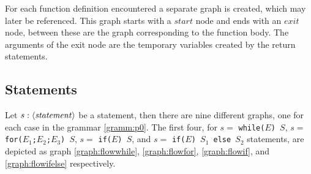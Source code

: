 For each function definition encountered a separate graph is created, which may later be referenced. This graph starts with a $\mathit{start}$ node and ends with an $\mathit{exit}$ node, between these are the graph corresponding to the function body. The arguments of the exit node are the temporary variables created by the return statements. 

\subsection{Statements}
Let $s : \langle\mathit{statement}\rangle$ be a statement, then there are nine different graphs, one for each case in the grammar \ref{gramm:p0}. The first four, for $s = $ \texttt{while($E$) $S$}, $s = $ \texttt{for($E_1$;$ E_2$;$E_3$) $S$}, $s = $ \texttt{if($E$) $S$}, and $s = $ \texttt{if($E$) $S_1$ else $S_2$} statements, are depicted as graph \ref{graph:flowwhile}, \ref{graph:flowfor}, \ref{graph:flowif}, and \ref{graph:flowifelse} respectively.


